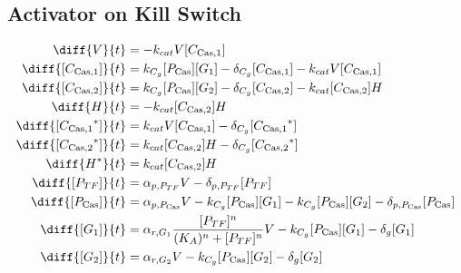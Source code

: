 \subsection{Activator on Kill Switch}
\label{s:TF_delayed_kill_switch}

\begin{align}
\diff{\vectorGen{}}{t} & = - \casCutRate{{}}\vectorGen{}\conc{\cplx{\cas}{1}}\\
\diff{\conc{\cplx{\cas}{1}}}{t} & =  \gRnaBind{}\conc{\proSp{\cas{}}}\conc{\gRna{1}} - \casCompDegradeRate{}\conc{\cplx{\cas}{1}} - \casCutRate{{}}\vectorGen{}\conc{\cplx{\cas}{1}}\\
\diff{\conc{\cplx{\cas}{2}}}{t} & =  \gRnaBind{}\conc{\proSp{\cas{}}}\conc{\gRna{2}} - \casCompDegradeRate{}\conc{\cplx{\cas}{2}} - \casCutRate{{}}\conc{\cplx{\cas}{2}}\hostGen{}\\
\diff{\hostGen{}}{t} & = - \casCutRate{{}}\conc{\cplx{\cas}{2}}\hostGen{}\\
\diff{\conc{\bound{\cplx{\cas}{1}}}}{t} & =  \casCutRate{{}}\vectorGen{}\conc{\cplx{\cas}{1}} - \casCompDegradeRate{}\conc{\bound{\cplx{\cas}{1}}}\\
\diff{\conc{\bound{\cplx{\cas}{2}}}}{t} & =  \casCutRate{{}}\conc{\cplx{\cas}{2}}\hostGen{} - \casCompDegradeRate{}\conc{\bound{\cplx{\cas}{2}}}\\
\diff{\edited{\hostGen{}}}{t} & =  \casCutRate{{}}\conc{\cplx{\cas}{2}}\hostGen{}\\
\diff{\conc{\proSp{TF}}}{t} & =  \txtlRate{\proSp{TF}}\vectorGen{} - \proDegradeRate{\proSp{TF}}\conc{\proSp{TF}}\\
\diff{\conc{\proSp{\cas{}}}}{t} & =  \txtlRate{\proSp{\cas{}}}\vectorGen{} - \gRnaBind{}\conc{\proSp{\cas{}}}\conc{\gRna{1}} - \gRnaBind{}\conc{\proSp{\cas{}}}\conc{\gRna{2}} - \proDegradeRate{\proSp{\cas{}}}\conc{\proSp{\cas{}}}\\
\diff{\conc{\gRna{1}}}{t} & =  \txRate{\gRna{1}}\frac{\conc{\proSp{TF}}^n}{(K_A)^n + \conc{\proSp{TF}}^n}\vectorGen{} - \gRnaBind{}\conc{\proSp{\cas{}}}\conc{\gRna{1}} - \rnaDegradeRate{}\conc{\gRna{1}}\\
\diff{\conc{\gRna{2}}}{t} & =  \txRate{\gRna{2}}\vectorGen{} - \gRnaBind{}\conc{\proSp{\cas{}}}\conc{\gRna{2}} - \rnaDegradeRate{}\conc{\gRna{2}}
\end{align}


